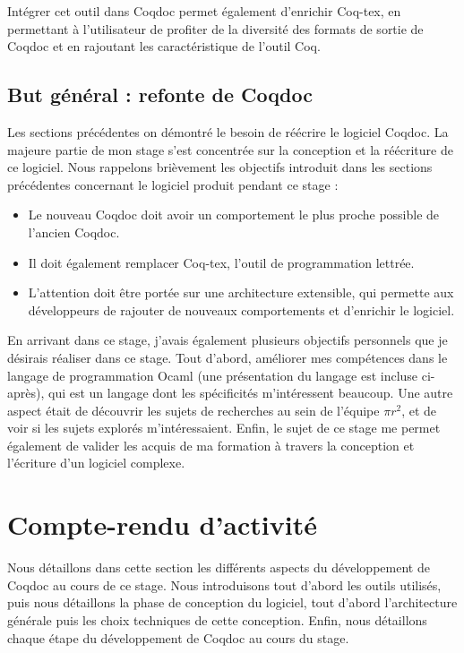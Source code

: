 \documentclass[a4paper, 11pt]{report}
\newcommand{\pir}[0]{\textbf{$\pi r^2$}\xspace}
\begin{document}
    Intégrer cet outil dans Coqdoc permet également d'enrichir Coq-tex, en
    permettant à l'utilisateur de profiter de la diversité des formats de
    sortie de Coqdoc et en rajoutant les caractéristique de l'outil Coq.

    \clearpage
    \subsection{But général : refonte de Coqdoc}
    Les sections précédentes on démontré le besoin de réécrire le logiciel
    Coqdoc. La majeure partie de mon stage s'est concentrée sur la conception
    et la réécriture de ce logiciel.
    Nous rappelons brièvement les objectifs introduit dans les sections
    précédentes concernant le logiciel produit pendant ce stage :
    \begin{itemize}
      \item Le nouveau Coqdoc doit avoir un comportement le plus proche
        possible de l'ancien Coqdoc.
      \item Il doit également remplacer Coq-tex, l'outil de programmation
        lettrée.
      \item L'attention doit être portée sur une architecture extensible, qui
        permette aux développeurs de rajouter de nouveaux comportements
        et d'enrichir le logiciel.
    \end{itemize}

    En arrivant dans ce stage, j'avais également plusieurs objectifs personnels
    que je désirais réaliser dans ce stage. Tout d'abord, améliorer
    mes compétences dans le langage de programmation Ocaml (une présentation
    du langage est incluse ci-après), qui est un langage dont les spécificités
    m'intéressent beaucoup.
    Une autre aspect était de découvrir les sujets de recherches au sein de
    l'équipe \pir, et de voir si les sujets explorés m'intéressaient.
    Enfin, le sujet de ce stage me permet également de valider les acquis de
    ma formation à travers la conception et l'écriture d'un logiciel complexe.

  \section{Compte-rendu d'activité}
  Nous détaillons dans cette section les différents aspects du développement
  de Coqdoc au cours de ce stage.  Nous introduisons tout d'abord les outils
  utilisés, puis nous détaillons la phase de conception du logiciel, tout
  d'abord l'architecture générale puis les choix techniques de cette
  conception. Enfin, nous détaillons chaque étape du développement de Coqdoc
  au cours du stage.
\end{document}
